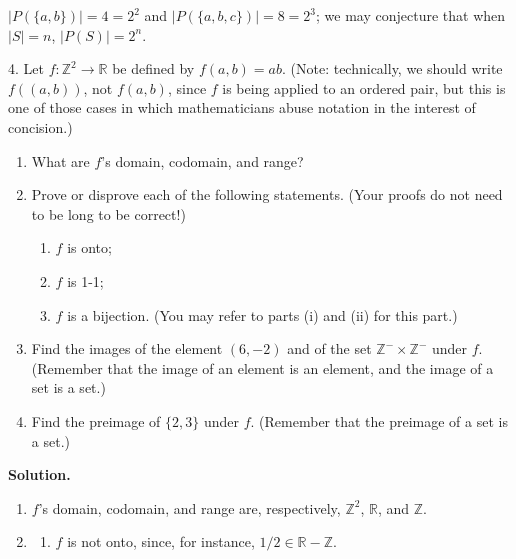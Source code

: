 \documentclass[10pt,]{book}
\theoremstyle{plain}
\theoremstyle{definition}
\theoremstyle{definition}
\theoremstyle{definition}
\theoremstyle{definition}
\numberwithin{equation}{section}
\def\Z{\mathbb{Z}}
\def\R{\mathbb{R}}
\begin{document}
\begin{exerciselist}
      \(|P(\{a,b\})|=4=2^2\) and \(|P(\{a,b,c\})|=8=2^3\); we may conjecture that when \(|S|=n\), \(|P(S)|=2^n\).
\item[4.]\hypertarget{exercise-4}{}
        Let \(f: \Z^2 \to \R\) be defined by \(f(a,b)=ab\). (Note: technically, we should write \(f((a,b))\), not \(f(a,b)\), since \(f\) is being applied to an ordered pair, but this is one of those cases in which mathematicians abuse notation in the interest of concision.)
\leavevmode%
\begin{enumerate}[label=(\alph*)]
\item\hypertarget{li-39}{}
          What are \(f\)'s domain, codomain, and range?
\item\hypertarget{li-40}{}
          Prove or disprove each of the following statements. (Your proofs do not need to be long to be correct!)
%
\begin{enumerate}[label=\roman*.]
\item\hypertarget{li-41}{}
              \(f\) is onto;
\item\hypertarget{li-42}{}
              \(f\) is 1-1;
\item\hypertarget{li-43}{}
              \(f\) is a bijection. (You may refer to parts (i) and (ii) for this part.)
\end{enumerate}
\item\hypertarget{li-44}{}
          Find the images of the element \((6,-2)\) and of the set \(\Z^- \times \Z^-\) under \(f\). (Remember that the image of an element is an element, and the image of a set is a set.)
\item\hypertarget{li-45}{}
          Find the preimage of \(\{2,3\}\) under \(f\). (Remember that the preimage of a set is a set.)
\end{enumerate}
\par\smallskip
\par\smallskip
\noindent\textbf{Solution.}\hypertarget{solution-4}{}\quad
\leavevmode%
\begin{enumerate}[label=(\alph*)]
\item\hypertarget{li-46}{}
        \(f\)'s domain, codomain, and range are, respectively, \(\Z^2\), \(\R\), and \(\Z\).
\item\hypertarget{li-47}{}%
\begin{enumerate}[label=\roman*.]
\item\hypertarget{li-48}{}
            \(f\) is not onto, since, for instance, \(1/2\in \R-\Z\).

\end{enumerate}
\end{enumerate}
\end{exerciselist}
\end{document}
